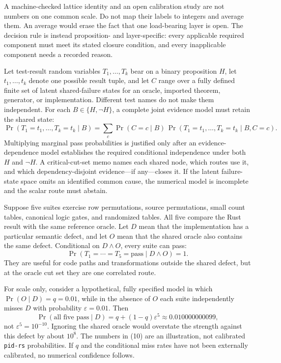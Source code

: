 \documentclass[11pt]{article}
\begin{document}
A machine-checked lattice identity and an open calibration study are not numbers on one common
scale.  Do not map their labels to integers and average them.  An average would erase the fact that
one load-bearing layer is open.  The decision rule is instead proposition- and layer-specific:
every applicable required component must meet its stated closure condition, and every
inapplicable component needs a recorded reason.


Let test-result random variables \(T_1,\ldots,T_k\) bear on a binary proposition \(H\), let
\(t_1,\ldots,t_k\) denote one possible result tuple, and let \(C\) range over a fully defined finite
set of latent shared-failure states for an oracle, imported theorem, generator, or implementation.
Different test names do not make them independent.  For each \(B\in\{H,\neg H\}\), a complete joint
evidence model must retain the shared state:
\[
  \Pr(T_1=t_1,\ldots,T_k=t_k\mid B)
  =
  \sum_c
  \Pr(C=c\mid B)\,
  \Pr(T_1=t_1,\ldots,T_k=t_k\mid B,C=c).
  \tag{8}
\]
Multiplying marginal pass probabilities is justified only after an evidence-dependence model
establishes the required conditional independence under both \(H\) and \(\neg H\).  A
critical-cut-set memo names each shared node, which routes use it, and which dependency-disjoint
evidence---if any---closes it.  If the latent failure-state space omits an identified common cause,
the numerical model is incomplete and the scalar route must abstain.


Suppose five suites exercise row permutations, source permutations, small count tables, canonical
logic gates, and randomized tables.  All five compare the Rust result with the same reference
oracle.  Let \(D\) mean that the implementation has a particular semantic defect, and let \(O\)
mean that the shared oracle also contains the same defect.  Conditional on
\(D\wedge O\), every suite can pass:
\[
  \Pr(T_1=\cdots=T_5=\mathrm{pass}\mid D\wedge O)=1.
  \tag{9}
\]
They are useful for code paths and transformations outside the shared defect, but at the oracle
cut set they are one correlated route.

For scale only, consider a hypothetical, fully specified model in which
\(\Pr(O\mid D)=q=0.01\), while in the absence of \(O\) each suite independently misses \(D\) with
probability \(\varepsilon=0.01\).  Then
\[
  \Pr(\text{all five pass}\mid D)
  =q+(1-q)\varepsilon^5
  \approx 0.010000000099,
  \tag{10}
\]
not \(\varepsilon^5=10^{-10}\).  Ignoring the shared oracle would overstate the strength against
this defect by about \(10^8\).  The numbers in (10) are an illustration, not calibrated
\texttt{pid-rs} probabilities.  If \(q\) and the conditional miss rates have not been externally
calibrated, no numerical confidence follows.
\end{document}
